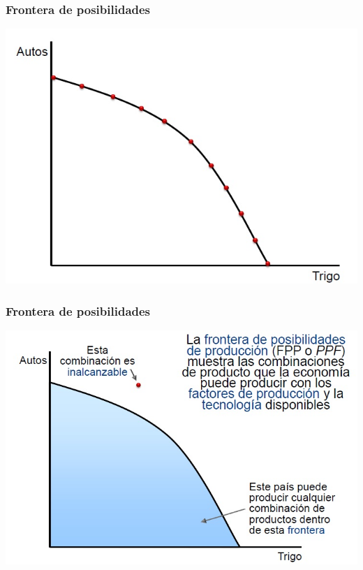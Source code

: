 \documentclass{beamer}
\begin{document}
\begin{frame}
\frametitle{Frontera de posibilidades}
\begin{center}
    \includegraphics[scale=0.6]{../Tema_11.3_frontera.jpg}
\end{center}
\end{frame}

\begin{frame}
\frametitle{Frontera de posibilidades}
\begin{center}
    \includegraphics[scale=0.55]{../Tema_11.4_fronteradeposibilidades.jpg}
\end{center}
\end{frame}
\end{document}
